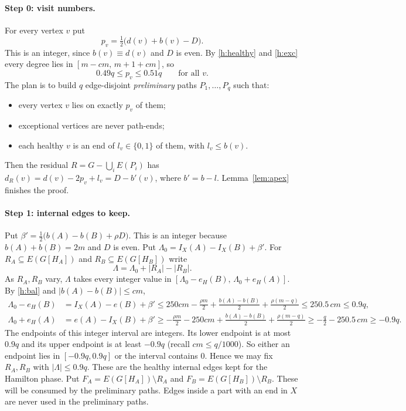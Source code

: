 \documentclass[11pt]{article}
\theoremstyle{definition}
\begin{document}
\paragraph{Step 0: visit numbers.} For every vertex $v$ put
\[
p_v=\tfrac12\bigl(d(v)+b(v)-D\bigr).
\]
This is an integer, since $b(v)\equiv d(v)$ and $D$ is even. By \ref{h:healthy} and \ref{h:exc} every degree lies in $[m-cm,\,m+1+cm]$, so
\begin{equation}\label{eq:pv}
0.49q\le p_v\le0.51q\qquad\text{for all }v.
\end{equation}
The plan is to build $q$ edge-disjoint \emph{preliminary} paths $P_1,\dots,P_q$ such that:
\begin{itemize}[nosep]
\item every vertex $v$ lies on exactly $p_v$ of them;
\item exceptional vertices are never path-ends;
\item each healthy $v$ is an end of $l_v\in\{0,1\}$ of them, with $l_v\le b(v)$.
\end{itemize}
Then the residual $R=G-\bigcup_iE(P_i)$ has $d_R(v)=d(v)-2p_v+l_v=D-b'(v)$, where $b'=b-l$. Lemma~\ref{lem:apex} finishes the proof.

\paragraph{Step 1: internal edges to keep.} Put $\beta'=\tfrac12\bigl(b(A)-b(B)+\rho D\bigr)$. This is an integer because $b(A)+b(B)=2m$ and $D$ is even. Put $\Lambda_0=I_X(A)-I_X(B)+\beta'$. For $R_A\subseteq E(G[H_A])$ and $R_B\subseteq E(G[H_B])$ write
\[
\Lambda=\Lambda_0+|R_A|-|R_B| .
\]
As $R_A,R_B$ vary, $\Lambda$ takes every integer value in $[\Lambda_0-e_H(B),\,\Lambda_0+e_H(A)]$. By \ref{h:bal} and $|b(A)-b(B)|\le cm$,
\begin{align*}
\Lambda_0-e_H(B)&=I_X(A)-e(B)+\beta'\le 250cm-\tfrac{\rho m}2+\tfrac{b(A)-b(B)}2+\tfrac{\rho(m-q)}2\le250.5\,cm\le0.9q,\\
\Lambda_0+e_H(A)&=e(A)-I_X(B)+\beta'\ge-\tfrac{\rho m}2-250cm+\tfrac{b(A)-b(B)}2+\tfrac{\rho(m-q)}2\ge-\tfrac q2-250.5\,cm\ge-0.9q .
\end{align*}
The endpoints of this integer interval are integers. Its lower endpoint is at most $0.9q$ and its upper endpoint is at least $-0.9q$ (recall $cm\le q/1000$). So either an endpoint lies in $[-0.9q,0.9q]$ or the interval contains $0$. Hence we may fix $R_A,R_B$ with $|\Lambda|\le0.9q$. These are the healthy internal edges kept for the Hamilton phase. Put $F_A=E(G[H_A])\setminus R_A$ and $F_B=E(G[H_B])\setminus R_B$. These will be consumed by the preliminary paths. Edges inside a part with an end in $X$ are never used in the preliminary paths.
\end{document}
